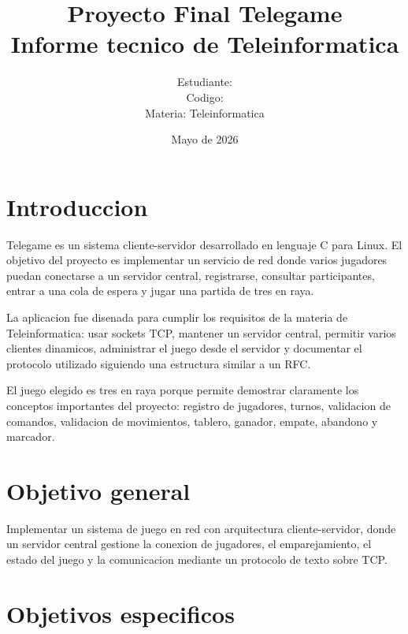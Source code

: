 \documentclass[12pt,a4paper]{article}
\title{
    \textbf{Proyecto Final Telegame}\\
    \large Informe tecnico de Teleinformatica
}
\author{
    Estudiante: \underline{\hspace{8cm}}\\
    Codigo: \underline{\hspace{8cm}}\\
    Materia: Teleinformatica
}
\date{Mayo de 2026}
\begin{document}
\maketitle
\newpage

\tableofcontents
\newpage

\section{Introduccion}

Telegame es un sistema cliente-servidor desarrollado en lenguaje C para Linux.
El objetivo del proyecto es implementar un servicio de red donde varios jugadores
puedan conectarse a un servidor central, registrarse, consultar participantes,
entrar a una cola de espera y jugar una partida de tres en raya.

La aplicacion fue disenada para cumplir los requisitos de la materia de
Teleinformatica: usar sockets TCP, mantener un servidor central, permitir varios
clientes dinamicos, administrar el juego desde el servidor y documentar el
protocolo utilizado siguiendo una estructura similar a un RFC.

El juego elegido es tres en raya porque permite demostrar claramente los
conceptos importantes del proyecto: registro de jugadores, turnos, validacion de
comandos, validacion de movimientos, tablero, ganador, empate, abandono y
marcador.

\section{Objetivo general}

Implementar un sistema de juego en red con arquitectura cliente-servidor, donde
un servidor central gestione la conexion de jugadores, el emparejamiento, el
estado del juego y la comunicacion mediante un protocolo de texto sobre TCP.

\section{Objetivos especificos}
\end{document}
